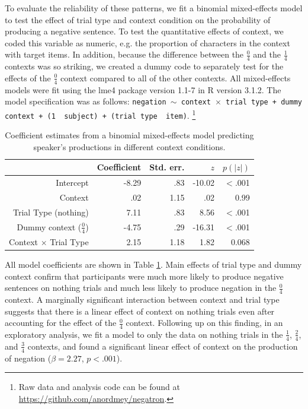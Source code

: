 \documentclass[man, noapacite]{apa2}
\begin{document}
To evaluate the reliability of these patterns, we fit a binomial mixed-effects model to test the effect of trial type and context condition on the probability of producing a negative sentence.  To test the quantitative effects of context, we coded this variable as numeric, e.g. the proportion of characters in the context with target items.  In addition, because the difference between the  $\frac{0}{4}$ and the  $\frac{1}{4}$ contexts was so striking, we created a dummy code to separately test for the effects of the  $\frac{0}{4}$ context compared to all of the other contexts.  All mixed-effects models were fit using the lme4 package version 1.1-7 in R version 3.1.2.  The model specification was as follows: \texttt{negation $\sim$ context~$\times$~trial type + dummy context + (1~\textbar~subject) +  (trial type~\textbar~item)}.  \footnote{Raw data and analysis code can be found at \url{https://github.com/anordmey/negatron}.}

\begin{table}[t]
\caption{\label{tab:speakermodel} Coefficient estimates from a binomial mixed-effects model predicting speaker's productions in different context conditions.}
\begin{center}
\begin{tabular}{rrrrr}
  \hline
 & Coefficient & Std. err. & $z$ & $p(|z|)$ \\ 
  \hline
Intercept & -8.29 & .83 & -10.02 & $<$.001 \\ 
  Context & .02 & 1.15 & .02 &  0.99 \\ 
  Trial Type (nothing) & 7.11 & .83 & 8.56 & $<$.001 \\
  Dummy context ($\frac{0}{4}$) & -4.75& .29 & -16.31 & $<$.001 \\ 
  Context $\times$ Trial Type & 2.15 & 1.18 & 1.82 & 0.068 \\
   \hline
\end{tabular}
\vspace{-1.5cm}
\end{center}
\end{table}

All model coefficients are shown in Table \ref{tab:speakermodel}.  Main effects of trial type and dummy context confirm that participants were much more likely to produce negative sentences on nothing trials and much less likely to produce negation in the $\frac{0}{4}$ context.  A marginally significant interaction between context and trial type suggests that there is a linear effect of context on nothing trials even after accounting for the effect of the $\frac{0}{4}$ context.  Following up on this finding, in an exploratory analysis, we fit a model to only the data on nothing trials in the $\frac{1}{4}$, $\frac{2}{4}$, and $\frac{3}{4}$ contexts, and found a significant linear effect of context on the production of negation ($\beta= 2.27$, $p< .001$).  
\end{document}
